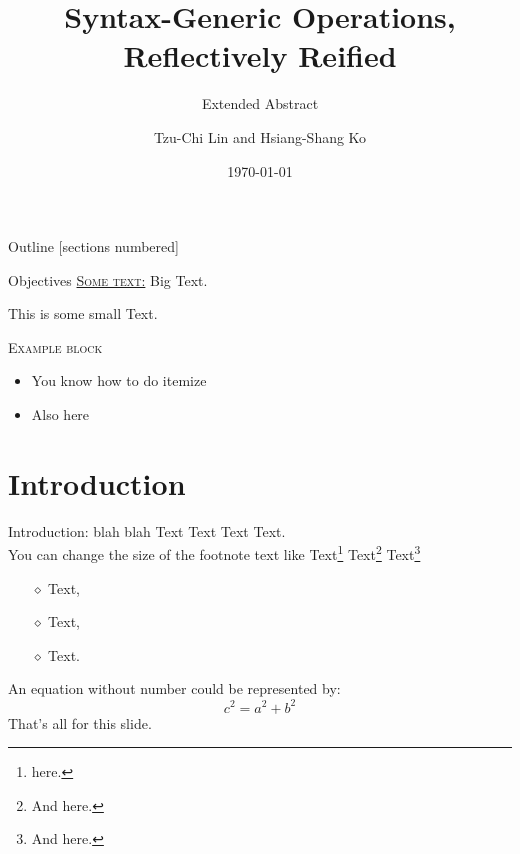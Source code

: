 \documentclass[10pt,xcolor=svgnames]{beamer} %
\title{Syntax-Generic Operations, Reflectively Reified}
\author[Name]{Tzu-Chi Lin and Hsiang-Shang Ko} %
\subtitle{Extended Abstract}
\institute[uni]{Institute of Information Science \\ Academia Sinica}
\date{\today} %
\begin{document}
{
\maketitle
}%


\begin{frame}{Outline}
  [sections numbered] %
  \tableofcontents[hideallsubsections] %
\end{frame}

\begin{frame}{Objectives}
\underline{\textsc{Some text:}}
Big Text.
\begin{small}
This is some small Text. 
\end{small}

\begin{exampleblock}{\textsc{Example block}}
\begin{itemize}
    \item You know how to do itemize
    \item Also here
\end{itemize}
\end{exampleblock}
\end{frame}


\section{Introduction}

\begin{frame}[fragile]{Introduction: blah blah} %
Text Text Text Text. \\You can change the size of the footnote text like  Text\footnote{\small{ here.}} Text\footnote{\large{And here.}} Text\footnote{\tiny{And here.}}
\begin{itemize} %
    \item[$\diamond$] Text,
    \item[$\diamond$] Text,
    \item[$\diamond$] Text.
\end{itemize}
An equation without number could be represented by:
\begin{equation*}
    c^{2} = a^{2} + b^{2}
\end{equation*}
That's all for this slide.
\end{frame}
\end{document}
